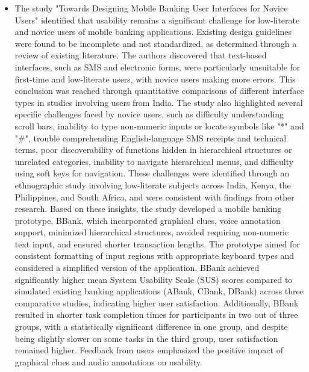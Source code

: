 \documentclass[a4paper,12pt]{report}
\begin{document}
\begin{itemize}
  \item The study "Towards Designing Mobile Banking User Interfaces for Novice Users" identified that usability remains a significant challenge for low-literate and novice users of mobile banking applications. Existing design guidelines were found to be incomplete and not standardized, as determined through a review of existing literature. The authors discovered that text-based interfaces, such as SMS and electronic forms, were particularly unsuitable for first-time and low-literate users, with novice users making more errors. This conclusion was reached through quantitative comparisons of different interface types in studies involving users from India. The study also highlighted several specific challenges faced by novice users, such as difficulty understanding scroll bars, inability to type non-numeric inputs or locate symbols like "*" and "\#", trouble comprehending English-language SMS receipts and technical terms, poor discoverability of functions hidden in hierarchical structures or unrelated categories, inability to navigate hierarchical menus, and difficulty using soft keys for navigation. These challenges were identified through an ethnographic study involving low-literate subjects across India, Kenya, the Philippines, and South Africa, and were consistent with findings from other research. Based on these insights, the study developed a mobile banking prototype, BBank, which incorporated graphical clues, voice annotation support, minimized hierarchical structures, avoided requiring non-numeric text input, and ensured shorter transaction lengths. The prototype aimed for consistent formatting of input regions with appropriate keyboard types and considered a simplified version of the application. BBank achieved significantly higher mean System Usability Scale (SUS) scores compared to simulated existing banking applications (ABank, CBank, DBank) across three comparative studies, indicating higher user satisfaction. Additionally, BBank resulted in shorter task completion times for participants in two out of three groups, with a statistically significant difference in one group, and despite being slightly slower on some tasks in the third group, user satisfaction remained higher. Feedback from users emphasized the positive impact of graphical clues and audio annotations on usability.

\end{itemize}
\end{document}
